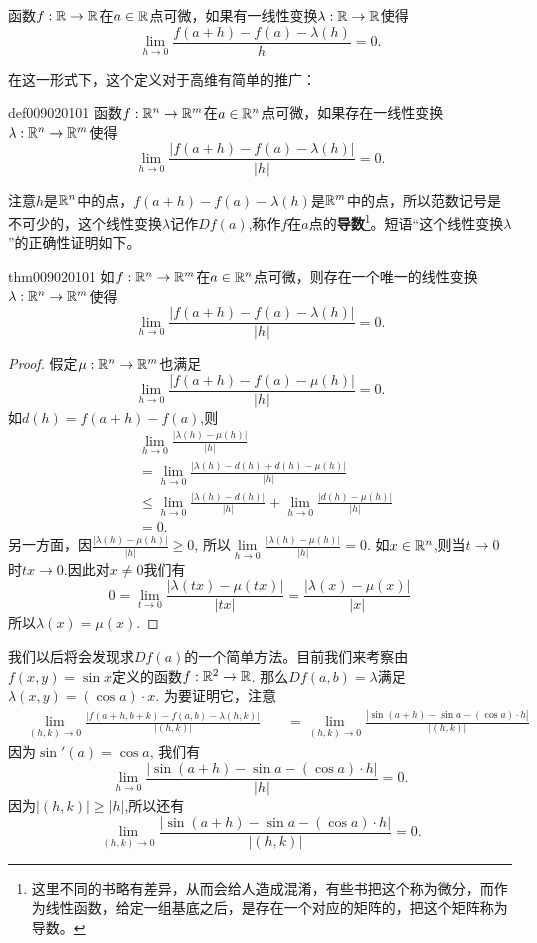函数$f:\mathbb{R} \to \mathbb{R}$在$a \in \mathbb{R}$点可微，如果有一线性变换$\lambda:\mathbb{R} \to \mathbb{R}$使得
\[
\lim_{h \to 0}{\frac{f(a+h) - f(a) - \lambda(h)}{h}} = 0.
\]

在这一形式下，这个定义对于高维有简单的推广：
\begin{definition}{}{def009020101}
函数$f:\mathbb{R}^n \to \mathbb{R}^m$在$a \in \mathbb{R}^n$点可微，如果存在一线性变换$\lambda:\mathbb{R}^n \to \mathbb{R}^m$使得
\[
\lim_{h \to 0}{\frac{|f(a+h) - f(a) - \lambda(h)|}{|h|}} = 0.
\]
\end{definition}
注意$h$是$\mathbb{R}^n$中的点，$f(a+h)-f(a)-\lambda(h)$是$\mathbb{R}^m$中的点，所以范数记号是不可少的，这个线性变换$\lambda$记作$Df(a)$,称作$f$在$a$点的\textbf{导数}\footnote{这里不同的书略有差异，从而会给人造成混淆，有些书把这个称为微分，而作为线性函数，给定一组基底之后，是存在一个对应的矩阵的，把这个矩阵称为导数。}。短语“这个线性变换$\lambda$”的正确性证明如下。
\begin{theorem}{}{thm009020101}
如$f: \mathbb{R}^n \to \mathbb{R}^m$在$a \in \mathbb{R}^n$点可微，则存在一个唯一的线性变换$\lambda:\mathbb{R}^n \to \mathbb{R}^m$使得
\[
\lim_{h \to 0}{\frac{|f(a+h) - f(a) - \lambda(h)|}{|h|}} = 0.
\]
\end{theorem}

\begin{proof}
假定$\mu:\mathbb{R}^n \to \mathbb{R}^m$也满足
\[
\lim_{h \to 0}{\frac{|f(a+h) - f(a) - \mu(h)|}{|h|}} = 0.
\]
如$d(h) = f(a+h) - f(a)$,则
\[
\begin{aligned}
&\lim_{h \to 0}{\frac{|\lambda(h) - \mu(h)|}{|h|}} \\
& = \lim_{h \to 0}{\frac{|\lambda(h) - d(h) + d(h) - \mu(h)|}{|h|}}\\
& \le \lim_{h \to 0}{\frac{|\lambda(h) - d(h)|}{|h|}} + \lim_{h \to 0}{\frac{|d(h) - \mu(h)|}{|h|}}\\
& = 0.
\end{aligned}
\]
另一方面，因$\frac{|\lambda(h) - \mu(h)|}{|h|} \ge 0$, 所以$\lim\limits_{h \to 0}{\frac{|\lambda(h) - \mu(h)|}{|h|}} = 0$. 如$x \in \mathbb{R}^n$,则当$t \to 0$时$tx \to 0$.因此对$x \neq 0$我们有
\[
0 = \lim_{t \to 0}{\frac{|\lambda(tx) - \mu(tx)|}{|tx|}} = \frac{|\lambda(x) - \mu(x)|}{|x|}
\]
所以$\lambda(x) = \mu(x)$.
\end{proof}

我们以后将会发现求$Df(a)$的一个简单方法。目前我们来考察由$f(x, y) = \sin{x}$定义的函数$f:\mathbb{R}^2 \to \mathbb{R}$. 那么$Df(a,b) = \lambda$满足$\lambda(x,y) = (\cos{a}) \cdot x$. 为要证明它，注意
\[
\begin{aligned}
&\lim_{(h,k) \to 0}{\frac{|f(a+h, b+k) - f(a, b) - \lambda(h, k)|}{|(h, k)|}}
&\quad = \lim_{(h,k) \to 0}{\frac{|\sin{(a+h)} - \sin{a} - (\cos{a}) \cdot h|}{|(h, k)|}}
\end{aligned}
\]
因为$\sin'(a) = \cos{a}$, 我们有
\[
\lim_{h \to 0}{\frac{|\sin(a + h) - \sin{a} - (\cos{a}) \cdot h|}{|h|}} = 0.
\]
因为$|(h, k)| \ge |h|$,所以还有
\[
\lim_{(h,k) \to 0}{\frac{|\sin{(a+h)} - \sin{a} - (\cos{a}) \cdot h|}{|(h, k)|}} = 0.
\]

